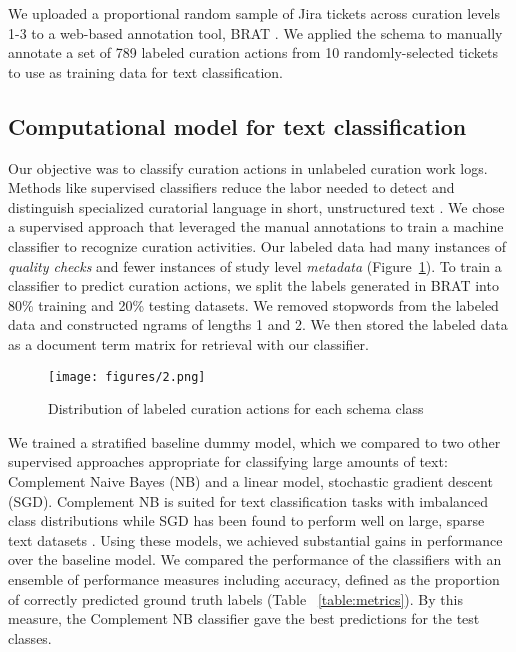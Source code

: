 \documentclass[conference]{IEEEtran}
\begin{document}
We uploaded a proportional random sample of Jira tickets across curation levels 1-3 to a web-based annotation tool, BRAT \cite{Stenetorp2012-bw}. We applied the schema to manually annotate a set of 789 labeled curation actions from 10 randomly-selected tickets to use as training data for text classification.  

\subsection{Computational model for text classification}
\label{classifier}
Our objective was to classify curation actions in unlabeled curation work logs. Methods like supervised classifiers reduce the labor needed to detect and distinguish specialized curatorial language in short, unstructured text \cite{Bird2009-vi, Hemphill2020-mv}. We chose a supervised approach that leveraged the manual annotations to train a machine classifier to recognize curation activities. Our labeled data had many instances of \textit{quality checks} and fewer instances of study level \textit{metadata} (Figure~\ref{fig:figure2}). To train a classifier to predict curation actions, we split the labels generated in BRAT into 80\% training and 20\% testing datasets. We removed stopwords from the labeled data and constructed ngrams of lengths 1 and 2. We then stored the labeled data as a document term matrix for retrieval with our classifier.  

\begin{figure}[t]
\texttt{[image: figures/2.png]}
\caption{Distribution of labeled curation actions for each schema class}
\label{fig:figure2}
\end{figure}

We trained a stratified baseline dummy model, which we compared to two other supervised approaches appropriate for classifying large amounts of text: Complement Naive Bayes (NB) and a linear model, stochastic gradient descent (SGD). Complement NB is suited for text classification tasks with imbalanced class distributions \cite{Rennie2003-bb} while SGD has been found to perform well on large, sparse text datasets \cite{Zhang2004-jb}. Using these models, we achieved substantial gains in performance over the baseline model. We compared the performance of the classifiers with an ensemble of performance measures including accuracy, defined as the proportion of correctly predicted ground truth labels (Table ~\ref{table:metrics}). By this measure, the Complement NB classifier gave the best predictions for the test classes.
\end{document}
